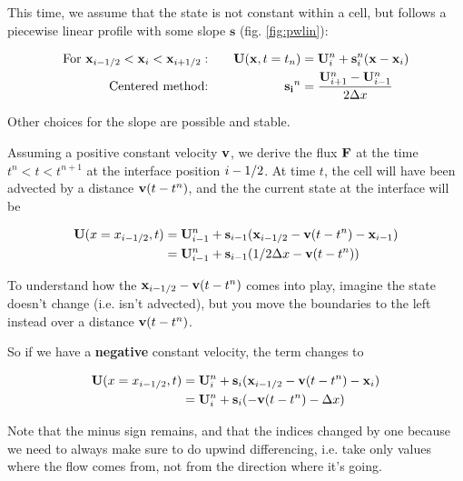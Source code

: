 This time, we assume that the state is not constant within a cell, but follows a piecewise linear profile with some slope $\mathbf{s}$ (fig. \ref{fig:pwlin}):

\begin{align*}
	\text{For } \mathbf{x}_{i-1/2} < \mathbf{x}_i < \mathbf{x}_{i+1/2}: &&
	\quad \mathbf{U}(\mathbf{x}, t=t_n) &= \mathbf{U}_i^n + \mathbf{s}_i^n(\mathbf{x} - \mathbf{x}_i) \\
	\text{Centered method:} && \mathbf{s_i}^n &= \frac{\mathbf{U}_{i+1}^n - \mathbf{U}_{i-1}^n}{ 2 \Delta x}
\end{align*}

Other choices for the slope are possible and stable.




Assuming a positive constant velocity $\mathbf{v}$, we derive the flux $\mathbf{F}$ at the time $t^n < t < t^{n+1}$ at the interface position $i-1/2$.
At time $t$, the cell will have been advected by a distance $\mathbf{v} (t - t^n)$, and the the current state at the interface will be

\begin{align*}
	\mathbf{U}(x=x_{i-1/2}, t) 
		&= \mathbf{U}_{i-1}^n + \mathbf{s}_{i-1} (\mathbf{x}_{i-1/2} - \mathbf{v} (t - t^n) - \mathbf{x}_{i-1}) \\
		&= \mathbf{U}_{i-1}^n + \mathbf{s}_{i-1} (1/2 \Delta x - \mathbf{v} (t - t^n))
\end{align*}

To understand how the $\mathbf{x}_{i-1/2} - \mathbf{v} (t - t^n)$ comes into play, imagine the state doesn't change (i.e. isn't advected), but you move the boundaries to the left instead over a distance $\mathbf{v}(t - t^n)$.

So if we have a \textbf{negative} constant velocity, the term changes to 

\begin{align*}
	\mathbf{U}(x=x_{i-1/2}, t) 
		&= \mathbf{U}_{i}^n + \mathbf{s}_{i} (\mathbf{x}_{i-1/2} - \mathbf{v} (t - t^n) - \mathbf{x}_{i}) \\
		&= \mathbf{U}_{i}^n + \mathbf{s}_{i} (-\mathbf{v} (t - t^n) - \Delta x)
\end{align*}



Note that the minus sign remains, and that the indices changed by one because we need to always make sure to do upwind differencing, i.e. take only values where the flow comes from, not from the direction where it's going.

